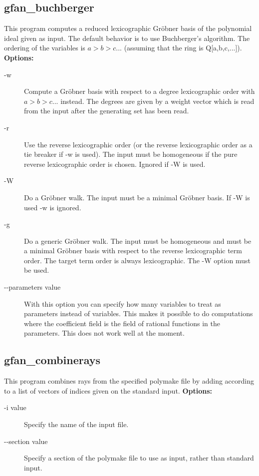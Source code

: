{{\subsection{gfan\_buchberger}\label{applist:_buchberger}
This program computes a reduced lexicographic Gr\"obner basis of the polynomial ideal given as input. The default behavior is to use Buchberger's algorithm. The ordering of the variables is $a>b>c...$ (assuming that the ring is Q[a,b,c,...]).
\newline
{\bf Options:}
\begin{description}
\item[-w]Compute a Gr\"obner basis with respect to a degree lexicographic order with $a>b>c...$ instead. The degrees are given by a weight vector which is read from the input after the generating set has been read.
\item[-r]Use the reverse lexicographic order (or the reverse lexicographic order as a tie breaker if -w is used). The input must be homogeneous if the pure reverse lexicographic order is chosen. Ignored if -W is used.
\item[-W]Do a Gr\"obner walk. The input must be a minimal Gr\"obner basis. If -W is used -w is ignored.
\item[-g]Do a generic Gr\"obner walk. The input must be homogeneous and must be a minimal Gr\"obner basis with respect to the reverse lexicographic term order. The target term order is always lexicographic. The -W option must be used.
\item[-\hspace{0.013cm}-parameters value]With this option you can specify how many variables to treat as parameters instead of variables. This makes it possible to do computations where the coefficient field is the field of rational functions in the parameters. This does not work well at the moment.\end{description}


{\subsection{gfan\_combinerays}\label{applist:_combinerays}
This program combines rays from the specified polymake file by adding according to a list of vectors of indices given on the standard input.
\newline
{\bf Options:}
\begin{description}
\item[-i value]Specify the name of the input file.\item[-\hspace{0.013cm}-section value]Specify a section of the polymake file to use as input, rather than standard input.\end{description}


}}}
